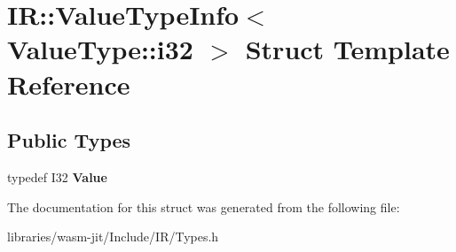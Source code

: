 \hypertarget{struct_i_r_1_1_value_type_info_3_01_value_type_1_1i32_01_4}{}\section{IR\+:\+:Value\+Type\+Info$<$ Value\+Type\+:\+:i32 $>$ Struct Template Reference}
\label{struct_i_r_1_1_value_type_info_3_01_value_type_1_1i32_01_4}
\subsection*{Public Types}
\begin{DoxyCompactItemize}
\item 
\mbox{\label{struct_i_r_1_1_value_type_info_3_01_value_type_1_1i32_01_4_a82f26fd490863a5abdd78d231d8c77d2}} 
typedef I32 {\bfseries Value}
\end{DoxyCompactItemize}


The documentation for this struct was generated from the following file\+:\begin{DoxyCompactItemize}
\item 
libraries/wasm-\/jit/\+Include/\+I\+R/Types.\+h\end{DoxyCompactItemize}
